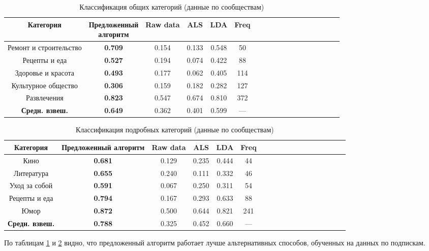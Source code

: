 \documentclass[times,specification,annotation]{itmo-student-thesis}
\begin{document}
\begin{table}[!h]
\caption{Классификация общих категорий (данные по сообществам)}\label{tab-subs-g}
\centering
\begin{tabular}{|*{18}{c|}}\hline
    Категория & \thead{Предложенный \\ алгоритм}  & Raw data & ALS & LDA & Freq \\\hline
Ремонт и строительство     & \textbf{0.709} & 0.154 & 0.133 & 0.548 & 50 \\\hline
Рецепты и еда                       & \textbf{0.527} & 0.194 & 0.074 & 0.422 & 88 \\\hline
Здоровье и красота             & \textbf{0.493} & 0.177 & 0.062 & 0.405 & 114 \\\hline
Культурное общество         & \textbf{0.306} & 0.159 & 0.182 & 0.282 & 127  \\\hline
Развлечения                           & \textbf{0.823} & 0.547 & 0.674 & 0.810 & 372 \\\hline
\textbf{Средн. взвеш.}                      & \textbf{0.649} & 0.362 & 0.401 & 0.599 & --- \\\hline
\end{tabular}
\end{table}

\begin{table}[!h]
\caption{Классификация подробных категорий (данные по сообществам)}\label{tab-subs-d}
\centering
\begin{tabular}{|*{18}{c|}}\hline
Категория & Предложенный алгоритм  & Raw data & ALS & LDA & Freq \\\hline
Кино                    & \textbf{0.681} & 0.129 & 0.235 & 0.444 & 44  \\\hline
Литература       & \textbf{0.655} & 0.240 & 0.111 & 0.332 & 46 \\\hline
Уход за собой   & \textbf{0.591} & 0.067 & 0.250 & 0.311 & 54 \\\hline
Рецепты и еда  & \textbf{0.794} & 0.167 & 0.293 & 0.633 & 88 \\\hline
Юмор                  & \textbf{0.872} & 0.500 & 0.644 & 0.821 & 241 \\\hline
\textbf{Средн. взвеш.}   & \textbf{0.788} & 0.325 & 0.452 & 0.660  & --- \\\hline
\end{tabular}
\end{table}

По таблицам \ref{tab-subs-g} и \ref{tab-subs-d} видно, что предложенный алгоритм работает лучше альтернативных способов, обученных на данных по подпискам.  
\end{document}
